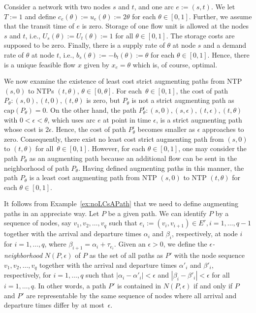 \documentclass{svjour3}                     \smartqed
\newcommand{\ca}{\ensuremath{\text{cap}}}
\begin{document}
\begin{example}\label{ex:noLCsAPath}
 Consider a network with two nodes $s$ and $t$, and one arc $e:=(s,t)$.  We let $T:=1$ and define $c_{e}(\theta):=u_{e}(\theta):=2\theta$ for each $\theta \in [0,1]$. Further, we assume that the transit time of $e$ is zero. Storage of one flow unit is allowed at the nodes $s$ and $t$, i.e., $U_s(\theta) := U_t(\theta) :=1$ for all $\theta\in [0,1]$. The storage costs are supposed to be zero. Finally, there is a supply rate of $\theta$ at node $s$ and a demand rate of $\theta$ at node $t$, i.e., $b_s(\theta) := -b_t(\theta) := \theta$ for each $\theta\in [0,1]$. Hence, there is a unique feasible flow $x$ given by $x_{e}=\theta$ which is, of course, optimal.

We now examine the existence of least cost strict augmenting paths from NTP~$(s,0)$ to NTPs $(t,\theta)$, $\theta\in [0,\theta]$. For each~${\theta\in [0,1]}$, the cost of path $P_\theta:(s,0),(t,0),(t,\theta)$ is zero, but $P_\theta$ is not a strict augmenting path as $\ca(P_\theta)=0$. On the other hand, the path $P^\epsilon_\theta:(s,0),(s,\epsilon),(t,\epsilon),(t,\theta)$ with $0<\epsilon < \theta$, which uses arc $e$ at point in time $\epsilon$, is a strict augmenting path whose cost is $2\epsilon$. Hence,  the cost of path $P^\epsilon_\theta$ becomes smaller as $\epsilon$ approaches to zero. Consequently, there exist no least cost strict augmenting path from $(s,0)$ to $(t,\theta)$ for all~${\theta\in [0,1]}$. However, for each $\theta\in [0,1]$, one may consider the path $P_\theta$ as an augmenting path because an additional flow can be sent in the neighborhood of path $P_\theta$. Having defined augmenting paths in this manner,  the path $P_\theta$ is a least cost augmenting path from NTP $(s,0)$ to NTP $(t,\theta)$ for each $\theta\in[0,1]$.
\end{example}









It follows from Example~\ref{ex:noLCsAPath} that we need to define  augmenting paths in an appreciate way. Let $P$ be a given path. We can identify $P$ by a sequence of nodes, say $v_1,v_2,\ldots,v_q$ such that $e_i:=(v_i,v_{i+1})\in E^r, i=1,\ldots,q-1$ together with the arrival and departure times $\alpha_i$ and $\beta_i$, respectively, at node $i$ for $i=1,\ldots,q$, where $\beta_{i+1}=\alpha_{i}+\tau_{e_i}$. Given an $\epsilon>0$, we define the \emph{$\epsilon$-neighborhood} $N(P,\epsilon)$ of $P$ as the set of all paths as $P'$ with the node sequence $v_1,v_2,\ldots,v_q$ together with the arrival and departure times $\alpha'_i$ and $\beta'_i$, respectively, for $i=1,\ldots,q$ such that $|\alpha_i-\alpha'_i|<\epsilon$ and $|\beta_i-\beta'_i|<\epsilon$ for all $i=1,\ldots,q$.
In other words, a path $P'$ is contained in $N(P,\epsilon)$ if and only if $P$ and $P'$ are representable by the same sequence of nodes where all arrival and departure times differ by at most~$\epsilon$. 
\end{document}
